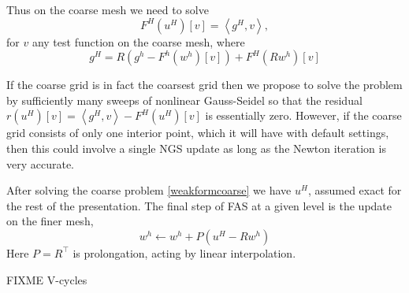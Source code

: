 \documentclass[letterpaper,final,12pt,reqno]{amsart}
\newcommand{\ip}[2]{\left<#1,#2\right>}
\begin{document}
Thus on the coarse mesh we need to solve
\begin{equation}
  F^H(u^H)[v] = \ip{g^H}{v},  \label{weakformcoarse}
\end{equation}
for $v$ any test function on the coarse mesh, where
  $$g^H = R (g^h - F^h(w^h)[v]) + F^H(R w^h)[v]$$

If the coarse grid is in fact the coarsest grid then we propose to solve the problem by sufficiently many sweeps of nonlinear Gauss-Seidel so that the residual $r(u^H)[v] = \ip{g^H}{v} - F^H(u^H)[v]$ is essentially zero.  However, if the coarse grid consists of only one interior point, which it will have with default settings, then this could involve a single NGS update as long as the Newton iteration is very accurate.

After solving the coarse problem \eqref{weakformcoarse} we have $u^H$, assumed exact for the rest of the presentation.  The final step of FAS at a given level is the update on the finer mesh,
\begin{equation}
  w^h \longleftarrow w^h + P(u^H - R w^h) \label{fasupdate}
\end{equation}
Here $P=R^\top$ is prolongation, acting by linear interpolation.

FIXME V-cycles

\small

\bigskip


\end{document}
